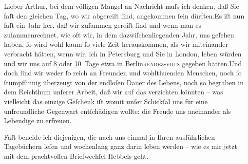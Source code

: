 \pstart{}Lieber Arthur,\pend\vspace{0.5em}
\pstart
           bei dem völligen Mangel an Nachricht muſs ich denken, daß Sie faſt den gleichen Tag,
               wo wir abgereiſt{ }ſind, angekommen{ }ſein dürften.\hspace*{1.5em}Es
               iſt nun faſt ein Jahr her, daß wir zuſammen gereiſt{ }ſind und wenn man es
               zuſammenrechnet, wie oft wir, in dem dazwiſchenliegenden Jahr, uns geſehen haben,{ }ſo
               wird wohl kaum{ }ſo viele Zeit herauskommen, als wir miteinander verbracht hätten, wenn
               wir, ich in Petersburg und Sie in London, leben würden und wir uns auf 8 oder
               10 Tage etwa in Berlin\textsc{rendez-vous} gegeben hätten.\hspace*{1.5em}Und doch{ }ſind wir weder{ }ſo reich an Freunden und wohlthuenden Menschen, noch{ }ſo{ }ſtumpfſinnig überzeugt von der endloſen Dauer des Lebens, noch so begraben in dem
               Reichthum unſerer Arbeit, daß wir auf das verzichten {\pb}könnten – was vielleicht das
               einzige Geſchenk iſt womit unſer Schickſal uns für eine unfreundliche Gegenwart
               entſchädigen wollte: die Freude uns aneinander als Lebendige zu erfreuen.\pend
           
\pstart
           Faſt beneide ich diejenigen, die nach uns einmal in Ihren ausführlichen Tagebüchern
               leſen und wochenlang ganz darin leben werden – wie es mir jetzt mit dem prachtvollen
                  Briefwechſel Hebbels geht.\pend
           
